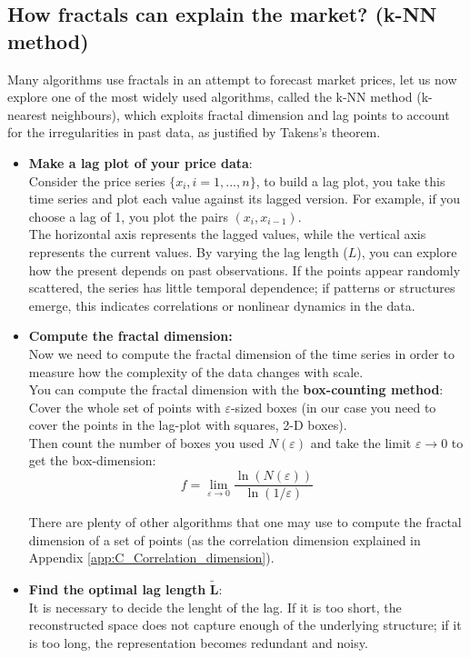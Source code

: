 \subsection{How fractals can explain the market? (k-NN method)}\label{sec:k-NN_method}
Many algorithms use fractals in an attempt to forecast market prices, let us now explore one of the most widely used algorithms, called the k-NN method (k-nearest neighbours), which exploits fractal dimension and lag points to account for the irregularities in past data, as justified by Takens's theorem.
\begin{itemize}
    \item \textbf{Make a lag plot of your price data}:\\
    Consider the price series $\{x_i,i=1,...,n\}$, to build a lag plot, you take this time series and plot each value against its lagged version. For example, if you choose a lag of 1, you plot the pairs $(x_i,x_{i-1})$.\\
The horizontal axis represents the lagged values, while the vertical axis represents the current values. By varying the lag length ($L$), you can explore how the present depends on past observations. If the points appear randomly scattered, the series has little temporal dependence; if patterns or structures emerge, this indicates correlations or nonlinear dynamics in the data.
    \item \textbf{Compute the fractal dimension:}\\
    Now we need to compute the fractal dimension of the time series in order to measure how the complexity of the data changes with scale. \\
    You can compute the fractal dimension with the \textbf{box-counting method}: \\

    Cover the whole set of points with $\varepsilon$-sized boxes (in our case you need to cover the points in the lag-plot with squares, 2-D boxes).\\
    Then count the number of boxes you used $N(\varepsilon)$ and take the limit $\varepsilon \to 0$ to get the box-dimension:
    \begin{equation*}
         f=\lim_{\varepsilon \rightarrow 0} \frac{\ln(N(\varepsilon))}{\ln(1/\varepsilon)}    
    \end{equation*}
    
    There are plenty of other algorithms that one may use to compute the fractal dimension of a set of points (as the correlation dimension explained in Appendix \ref{app:C_Correlation_dimension}).
    \item \textbf{Find the optimal lag length} $\boldsymbol{\tilde{L}}$:\\
    It is necessary to decide the lenght of the lag. If it is too short, the reconstructed space does not capture enough of the underlying structure; if it is too long, the representation becomes redundant and noisy.\\
    

\end{itemize}
